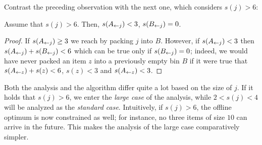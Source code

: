 Contrast the preceding observation with the next one, which considers $s(j) > 6$:

\begin{obs}
\label{obs:1b}
Assume that $s(j) > 6$. Then, $s(A_{\leftarrow j}) < 3$, $s(B_{\leftarrow j}) = 0$.
\end{obs}

\begin{proof} If $s(A_{\leftarrow j}) \ge 3$ we reach  by packing
$j$ into $B$.  However, if $s(A_{\leftarrow j}) < 3$ then $s(A_{\leftarrow j}) + s(B_{\leftarrow j}) < 6$
which can be true only if $s(B_{\leftarrow j}) = 0$; indeed, we would have never packed an item $z$ into
 a previously empty bin $B$ if it were true that $s(A_{\leftarrow z}) + s(z) < 6$, $s(z) < 3$ and $s(A_{\leftarrow z}) < 3$. 
\end{proof}

Both the analysis and the algorithm differ quite a lot based on the
size of $j$. If it holds that $s(j) > 6$, we enter the \emph{large
case} of the analysis, while $2 < s(j) < 4$ will be analyzed as the
\emph{standard case}. Intuitively, if $s(j) > 6$, the offline optimum
is now constrained as well; for instance, no three items of size $10$
can arrive in the future. This makes the analysis of
the large case comparatively simpler.
